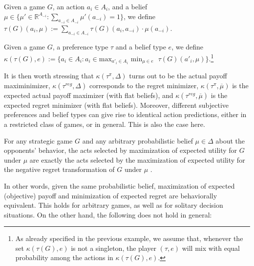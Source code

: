 \documentclass[fleqn,reqno,11pt]{article}
\begin{document}
\begin{definition} \label{def:utility-belief}

Given a game $G$, an action $a_i \in A_i$, and a belief $\mu \in \lbrace \mu' \in \mathbb{R}^{A_{-i}}: \sum_{a_{-i} \in A_{-i}} \mu'(a_{-i}) = 1 \rbrace$, we define $\tau(G)(a_i, \mu):= \sum_{a_{-i} \in A_{-i}} \tau(G)(a_i, a_{-i}) \cdot \mu(a_{-i})$. 

\end{definition}

\begin{definition} \label{def:maxminSEU}

Given a game $G$, a preference type $\tau$ and a belief type $e$, we define $\kappa(\tau(G), e):= \lbrace a_i \in A_i : a_i \in \text{max}_{a'_i \in A_i} \text{ min}_{\mu \in e} \text{ } \tau(G)(a'_i, \mu) \rbrace$.\footnote{As already specified in the previous example, we assume that, whenever the set $\kappa(\tau(G), e)$ is not a singleton, the player $(\tau, e)$ will mix with equal probability among the actions in $\kappa(\tau(G), e)$.}

\end{definition}

It is then worth stressing that $\kappa(\tau^{\pi}, \Delta)$ turns out to be the actual payoff
maximinimizer, $\kappa(\tau^{reg}, \Delta)$ corresponds to the regret minimizer,
$\kappa(\tau^{\pi}, \overline{\mu})$ is the expected actual payoff maximizer (with flat beliefs), and
$\kappa(\tau^{reg}, \overline{\mu})$ is the expected regret minimizer (with flat beliefs).
Moreover, different subjective preferences and belief types can give rise to identical action predictions,
either in a restricted class of games, or in general. This is also the case here.




\begin{fact} \label{fact:maxEU-minReg} For any strategic game $G$ and any arbitrary
  probabilistic belief $\mu \in \Delta$ about the opponents' behavior, the acts
  selected by maximization of expected utility for $G$ under $\mu$ are exactly the acts
  selected by the maximization of expected utility for the negative regret transformation of $G$
  under $\mu$ \citep[e.g.,][]{HalpernPass2012:Iterated-Regret}.
\end{fact}

\noindent In other words, given the same probabilistic belief, maximization of expected
(objective) payoff and minimization of expected regret are behaviorally
equivalent. This holds for arbitrary games, as well as for solitary decision situations. On the
other hand, the following does not hold in general:
\end{document}
